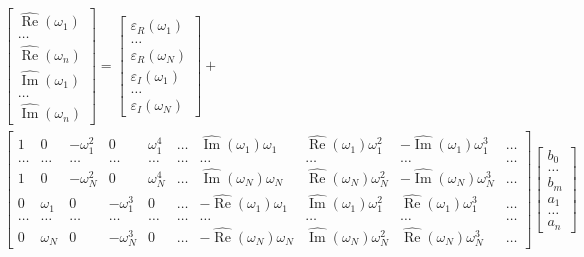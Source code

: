 \documentclass{article}
\begin{document}
	$$ \begin{aligned}
& {\left[\begin{array}{c}
\hat{\operatorname{Re}}\left(\omega_1\right) \\
\ldots \\
\hat{\operatorname{Re}}\left(\omega_n\right) \\
\hat{\operatorname{Im}}\left(\omega_1\right) \\
\ldots \\
\hat{\operatorname{Im}}\left(\omega_n\right)
\end{array}\right]=\left[\begin{array}{l}
\varepsilon_R\left(\omega_1\right) \\
\ldots \\
\varepsilon_R\left(\omega_N\right) \\
\varepsilon_I\left(\omega_1\right) \\
\ldots \\
\varepsilon_I\left(\omega_N\right)
\end{array}\right]+} \\
& {\left[\begin{array}{llllllllll}
1 & 0 & -\omega_1^2 & 0 & \omega_1^4 & \ldots & \hat{\operatorname{Im}}\left(\omega_1\right) \omega_1 & \hat{\operatorname{Re}}\left(\omega_1\right) \omega_1^2 & -\hat{\operatorname{Im}}\left(\omega_1\right) \omega_1^3 & \ldots \\
\ldots & \ldots & \ldots & \ldots & \ldots & \ldots & \ldots & \ldots & \ldots & \ldots \\
1 & 0 & -\omega_N^2 & 0 & \omega_N^4 & \ldots & \hat{\operatorname{Im}}\left(\omega_N\right) \omega_N & \hat{\operatorname{Re}}\left(\omega_N\right) \omega_N^2 & -\hat{\operatorname{Im}}\left(\omega_N\right) \omega_N^3 & \ldots \\
0 & \omega_1 & 0 & -\omega_1^3 & 0 & \ldots & -\hat{\operatorname{Re}}\left(\omega_1\right) \omega_1 & \hat{\operatorname{Im}}\left(\omega_1\right) \omega_1^2 & \hat{\operatorname{Re}}\left(\omega_1\right) \omega_1^3 & \ldots \\
\ldots & \ldots & \ldots & \ldots & \ldots & \ldots & \ldots & \ldots & \ldots & \ldots \\
0 & \omega_N & 0 & -\omega_N^3 & 0 & \ldots & -\hat{\operatorname{Re}}\left(\omega_N\right) \omega_N & \hat{\operatorname{Im}}\left(\omega_N\right) \omega_N^2 & \hat{\operatorname{Re}}\left(\omega_N\right) \omega_N^3 & \ldots
\end{array}\right]\left[\begin{array}{l}
b_0 \\
\ldots \\
b_m \\
a_1 \\
\ldots \\
a_n
\end{array}\right]}
\end{aligned} $$
\end{document}
